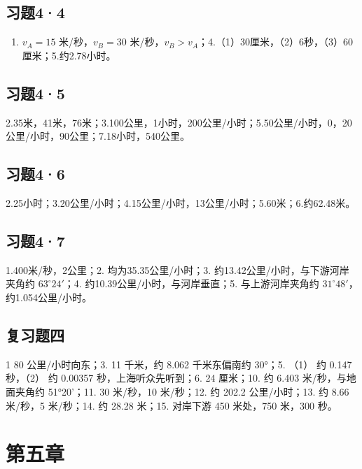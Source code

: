 \subsection{习题4·4}\label{ux4e60ux989844-1}

\begin{enumerate}
\def\labelenumi{\arabic{enumi}.}
\setcounter{enumi}{2}
\tightlist
\item
  \(v_A = 15\) 米/秒，\(v_B = 30\)
  米/秒，\(v_B > v_A\)；4.（1）30厘米，（2）6秒，（3）60厘米；5.约2.78小时。
\end{enumerate}

\subsection{习题4·5}\label{ux4e60ux989845-1}

2.35米，41米，76米；3.100公里，1小时，200公里/小时；5.50公里/小时，0，20公里/小时，90公里；7.18小时，540公里。

\subsection{习题4·6}\label{ux4e60ux989846-1}

2.25小时；3.20公里/小时；4.15公里/小时，13公里/小时；5.60米；6.约62.48米。

\subsection{习题4·7}\label{ux4e60ux989847-1}

1.400米/秒，2公里；2. 均为35.35公里/小时；3.
约13.42公里/小时，与下游河岸夹角约 \(63^{\circ}24'\)；4.
约10.39公里/小时，与河岸垂直；5. 与上游河岸夹角约
\(31^{\circ}48'\)，约1.054公里/小时。

\subsection{复习题四}\label{ux590dux4e60ux9898ux56db-1}

1 80 公里/小时向东；3. 11 千米，约 8.062 千米东偏南约 30°；5. （1） 约
0.147 秒，（2） 约 0.00357 秒，上海听众先听到；6. 24 厘米；10. 约 6.403
米/秒，与地面夹角约 51°20'；11. 30 米/秒，10 米/秒；12. 约 202.2
公里/小时；13. 约 8.66 米/秒，5 米/秒；14. 约 28.28 米；15. 对岸下游 450
米处，750 米，300 秒。

\section{第五章}\label{ux7b2cux4e94ux7ae0}

